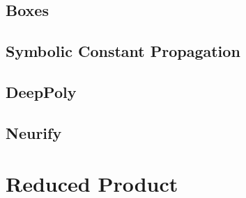 \subsection{Boxes}

\subsection{Symbolic Constant Propagation}

\subsection{DeepPoly}

\subsection{Neurify}


\section{Reduced Product}
